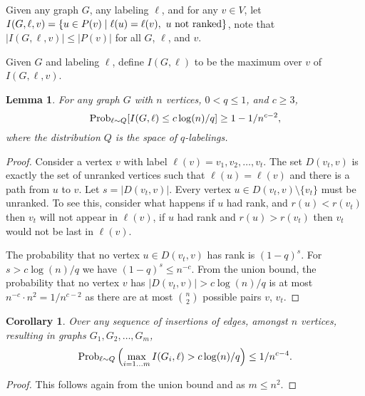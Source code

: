 \documentclass[11pt]{article}
\theoremstyle{plain}
\newtheorem{cor}[thm]{Corollary}
\newtheorem{lem}[thm]{Lemma}
\theoremstyle{definition}
\theoremstyle{remark}
\numberwithin{equation}{section}
\begin{document}
 Given any graph $G$, any labeling $\ell$, and for any $v\in V$, let $I(G,\ell,v) = \{u\in P(v)\mid \ell(u)=\ell(v), \mbox{\rm\ $u$ not ranked}\}$, note that $|I(G,\ell,v)| \leq |P(v)|$ for all $G$, $\ell$, and $v$.

 Given $G$ and labeling $\ell$, define $I(G,\ell)$ to be the maximum over $v$ of $I(G,\ell,v)$.




 \begin{lem} \label{lem:backsize}
   For any graph $G$ with $n$ vertices, $0<q\leq 1$, and $c\geq
   3$, $$\mbox{\rm Prob}_{\ell \sim Q}[ I(G,\ell) \leq c\log(n) /q ] \geq 1-1/n^{c-2},$$ where the distribution $Q$ is the space of $q$-labelings.
 \end{lem}
 \begin{proof}
   Consider a vertex $v$ with label $\ell(v)= v_1,v_2, \ldots, v_t$. The set $D(v_t,v)$ is exactly the set of unranked vertices such that $\ell(u)=\ell(v)$ and there is a path from $u$ to $v$.
   Let $s=|D(v_t,v)|$. Every vertex $u\in D(v_t,v)\setminus \{v_t\}$ must be unranked. To see this, consider what happens if $u$ had rank, and $r(u)<r(v_t)$ then $v_t$ will not appear in $\ell(v)$, if $u$ had rank and $r(u)> r(v_t)$ then $v_t$ would not be last in $\ell(v)$.

  The probability that no vertex $u\in D(v_t,v)$ has rank is $(1-q)^s$. For $s>c\log(n)/q$ we have $(1-q)^s\leq n^{-c}$.
  From the union bound, the probability that no vertex $v$ has $|D(v_t,v)|>c \log(n)/q$ is at most $n^{-c} \cdot n^2= 1/n^{c-2}$ as there are at most $n \choose 2$ possible pairs $v$, $v_t$.

\end{proof}

\begin{cor}\label{cor:backsize}
  Over any sequence of insertions of edges, amongst $n$ vertices, resulting in graphs $G_1, G_2, \ldots, G_m$, $$\mbox{\rm Prob}_{\ell \sim Q}\left(\max_{i=1\ldots m} I(G_i,\ell)>c \log(n)/q\right) \leq 1/n^{c-4}.$$
\end{cor}
\begin{proof}
  This follows again from the union bound and as $m \leq n^2$.
\end{proof}
\end{document}
